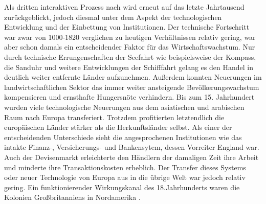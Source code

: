 Als dritten interaktiven Prozess nach \citet{Maddison.2001} wird erneut auf das letzte Jahrtausend zurückgeblickt, jedoch diesmal unter dem Aspekt der technologischen Entwicklung und der Einbettung von Institutionen. \newline Der technische Fortschritt war zwar von 1000-1820 verglichen zu heutigen Verhältnissen relativ gering, war aber schon damals ein entscheidender Faktor für das Wirtschaftswachstum. Nur durch technische Errungenschaften der Seefahrt wie beispielsweise der Kompass, die Sanduhr und  weitere Entwicklungen der Schifffahrt gelang es den Handel in deutlich weiter entfernte Länder aufzunehmen. Außerdem konnten Neuerungen im landwirtschaftlichen Sektor das immer weiter ansteigende Bevölkerungswachstum kompensieren und ernsthafte Hungersnöte verhindern. Bis zum 15. Jahrhundert wurden viele technologische Neuerungen aus dem asiatischen und arabischen Raum nach Europa transferiert. Trotzdem profitierten letztendlich die europäischen Länder stärker als die Herkunftsländer selbst. Als einer der entscheidenden Unterschiede sieht \citet{Maddison.2001} die angesprochenen Institutionen wie das intakte Finanz-, Versicherungs- und Bankensytem, dessen Vorreiter England war. Auch der Devisenmarkt erleichterte den Händlern der damaligen Zeit ihre Arbeit und minderte ihre Transaktionskosten erheblich.  \newline Der Transfer dieses Systems oder neuer Technologie von Europa aus in die übrige Welt war jedoch relativ gering. Ein funktionierender Wirkungskanal des 18.Jahrhunderts waren die Kolonien Großbritanniens in Nordamerika \citep{Maddison.2001}.


